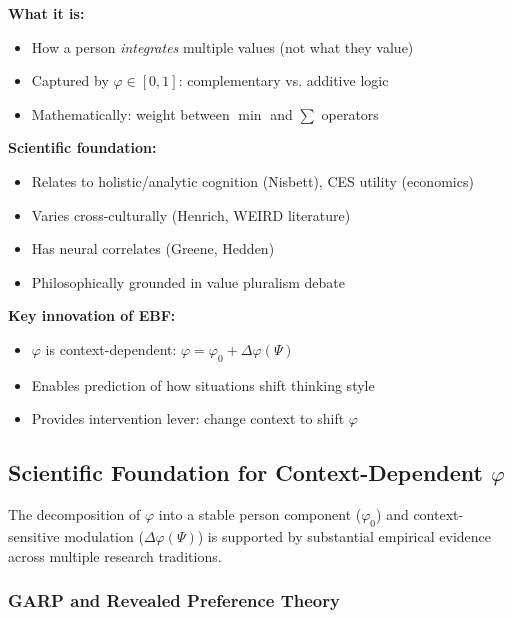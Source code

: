 \begin{tcolorbox}[
  colback=blue!3,
  colframe=blue!50!black,
  title={\textbf{Thinking Style: Key Points}},
  fonttitle=\bfseries\sffamily
]

\textbf{What it is:}
\begin{itemize}
\item How a person \textit{integrates} multiple values (not what they value)
\item Captured by $\varphi \in [0,1]$: complementary vs. additive logic
\item Mathematically: weight between $\min$ and $\sum$ operators
\end{itemize}

\textbf{Scientific foundation:}
\begin{itemize}
\item Relates to holistic/analytic cognition (Nisbett), CES utility (economics)
\item Varies cross-culturally (Henrich, WEIRD literature)
\item Has neural correlates (Greene, Hedden)
\item Philosophically grounded in value pluralism debate
\end{itemize}

\textbf{Key innovation of EBF:}
\begin{itemize}
\item $\varphi$ is context-dependent: $\varphi = \varphi_0 + \Delta\varphi(\Psi)$
\item Enables prediction of how situations shift thinking style
\item Provides intervention lever: change context to shift $\varphi$
\end{itemize}

\end{tcolorbox}



\subsection{Scientific Foundation for Context-Dependent $\varphi$}
\label{sec:phi-scientific}

The decomposition of $\varphi$ into a stable person component ($\varphi_0$) and context-sensitive modulation ($\Delta\varphi(\Psi)$) is supported by substantial empirical evidence across multiple research traditions.

\subsubsection{GARP and Revealed Preference Theory}


